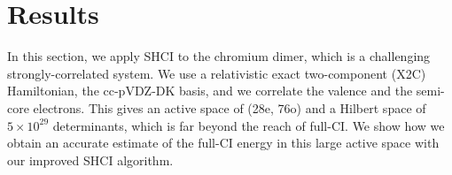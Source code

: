 \documentclass[%
preprint,
 superscriptaddress,
 amsmath,amssymb,
 aps,
]{revtex4-1}
\begin{document}






\section{Results}
\label{results}

In this section, we apply SHCI to the chromium dimer, which is a challenging strongly-correlated system.
We use a relativistic exact two-component (X2C) Hamiltonian, the cc-pVDZ-DK basis, and we correlate the valence and the semi-core electrons.
This gives an active space of (28e, 76o) and a Hilbert space of $5\times10^{29}$ determinants, which is far beyond the reach of full-CI.
We show how we obtain an accurate estimate of the full-CI energy in this large active space with our improved SHCI algorithm.
\end{document}
